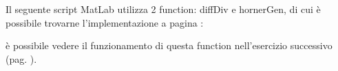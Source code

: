 \begin{flushleft}
Il seguente script MatLab utilizza 2 function: diffDiv e hornerGen, di cui è possibile trovarne l'implementazione a pagina \pageref{functcap4}:

è possibile vedere il funzionamento di questa function nell'esercizio successivo (pag. \pageref{es42}).
\end{flushleft}